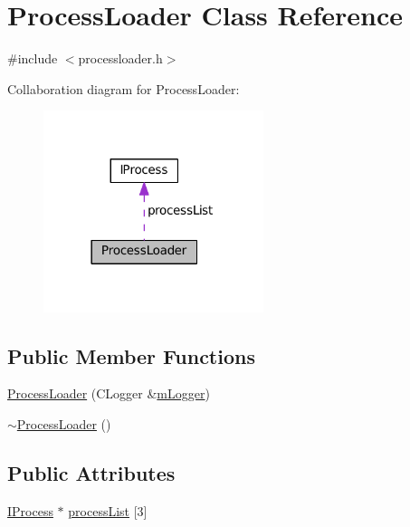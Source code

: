 \hypertarget{classProcessLoader}{}\section{Process\+Loader Class Reference}
\label{classProcessLoader}


{\ttfamily \#include $<$processloader.\+h$>$}



Collaboration diagram for Process\+Loader\+:
\nopagebreak
\begin{figure}[H]
\begin{center}
\leavevmode
\includegraphics[width=182pt]{classProcessLoader__coll__graph}
\end{center}
\end{figure}
\subsection*{Public Member Functions}
\begin{DoxyCompactItemize}
\item 
\hyperlink{classProcessLoader_ab05abf5a6940a941313b66091993ebca}{Process\+Loader} (C\+Logger \&\hyperlink{classProcessLoader_a46ab766d18e7107c79aa47887013a6ac}{m\+Logger})
\item 
\hyperlink{classProcessLoader_a1c2b6cca84ea0c5716ec505eccae01d8}{$\sim$\+Process\+Loader} ()
\end{DoxyCompactItemize}
\subsection*{Public Attributes}
\begin{DoxyCompactItemize}
\item 
\hyperlink{classIProcess}{I\+Process} $\ast$ \hyperlink{classProcessLoader_a6189a22091af37309df381cade676d51}{process\+List} \mbox{[}3\mbox{]}
\end{DoxyCompactItemize}
